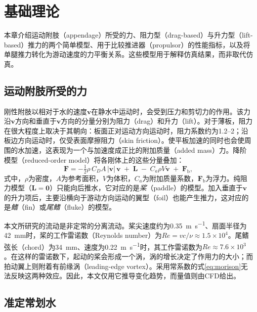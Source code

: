 \chapter{基础理论}
\label{ch:foundations}

本章介绍运动附肢（appendage）所受的力、阻力型（drag-based）与升力型（lift-based）推力的两个简单模型、用于比较推进器（propulsor）的性能指标，以及将单腿推力转化为游动速度的力平衡关系。这些模型用于解释仿真结果，而非取代仿真。

\section{运动附肢所受的力}
\label{sec:fund-forces}

刚性附肢以相对于水的速度$\bm v$在静水中运动时，会受到压力和剪切力的作用。该力沿$\bm v$方向和垂直于$\bm v$方向的分量分别为阻力（drag）和升力（lift）。对于薄板，阻力在很大程度上取决于其朝向：板面正对运动方向运动时，阻力系数约为1.2--2\cite{Newman1977}；沿板边方向运动时，仅受表面摩擦阻力（skin friction）。使平板加速的同时也会使周围的水加速，这表现为一个与加速度成正比的附加质量（added mass）力。降阶模型（reduced-order model）将各刚体上的这些分量叠加\cite{Morison1950,Fossen1994}：
\begin{equation}
  \bm F = -\tfrac12\rho\, C_D A\, |\bm v|\,\bm v \;+\; \bm L \;-\; C_a \rho V \dot{\bm v} \;+\; \bm F_\text{b},
  \label{eq:morison}
\end{equation}
式中，$\rho$为密度，$A$为参考面积，$V$为体积，$C_a$为附加质量系数，$\bm F_\text{b}$为浮力。纯阻力模型（$\bm L=\bm 0$）只能向后推水，它对应的是\emph{桨}（paddle）的模型。加入垂直于$\bm v$的升力项后，主要沿横向于游动方向运动的翼型（foil）也能产生推力，这对应的是\emph{鳍}（fin）或\emph{尾鳍}（fluke）的模型。

本文所研究的流动是非定常的分离流动。桨尖速度约为\SI{0.35}{\metre\per\second}、扇面半径为\SI{42}{\milli\metre}时，桨的工作雷诺数（Reynolds number）为$\mathit{Re}=vc/\nu\approx1.5\times10^4$。尾鳍弦长（chord）为\SI{34}{\milli\metre}、速度为\SI{0.22}{\metre\per\second}时，其工作雷诺数为$\mathit{Re}\approx7.6\times10^3$。在这样的雷诺数下，起动的桨会形成一个涡，涡的增长决定了作用力的大小\cite{Kim2011}；而拍动翼上则附着有前缘涡（leading-edge vortex）\cite{Triantafyllou1991,Anderson1998}。采用常系数的式\eqref{eq:morison}无法反映这两种效应。因此，本文仅用它推导变化趋势，而量值则由CFD给出。

\section{准定常划水}
\label{sec:fund-paddle}


